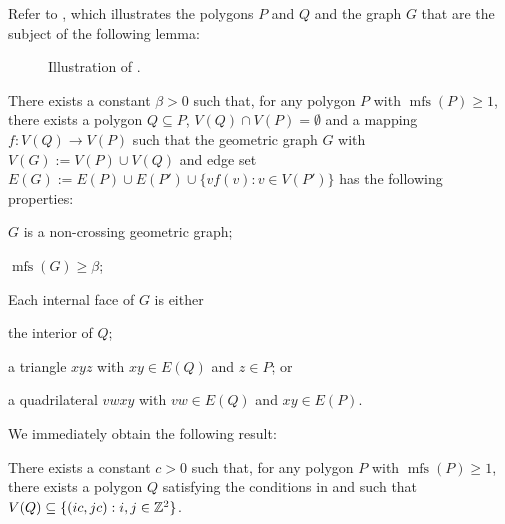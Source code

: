 \documentclass{article}
\DeclareMathOperator{\mfs}{mfs}
\begin{document}
Refer to , which illustrates the polygons $P$ and $Q$ and the graph $G$ that are the subject of the following lemma:

\begin{figure}
    \centering{\texttt{[image: pq]}}
    \caption{Illustration of .}
\end{figure}

\begin{lem}
    There exists a constant $\beta >0$ such that, for any polygon $P$ with $\mfs(P)\ge 1$, there exists a polygon $Q\subseteq P$, $V(Q)\cap V(P)=\emptyset$ and a mapping $f:V(Q)\to V(P)$ such that the geometric graph $G$ with $V(G):=V(P)\cup V(Q)$ and edge set $E(G):=E(P)\cup E(P')\cup\{vf(v):v\in V(P')\}$ has the following properties:
    \begin{compactenum}[(P1)]
        \item $G$ is a non-crossing geometric graph;
        \item $\mfs(G)\ge \beta$;
        \item Each internal face of $G$ is either
        \begin{compactenum}[(i)]
            \item the interior of $Q$;
            \item a triangle $xyz$ with $xy\in E(Q)$ and $z\in P$; or
            \item a quadrilateral $vwxy$ with $vw\in E(Q)$ and $xy\in E(P)$.
        \end{compactenum}
    \end{compactenum}
\end{lem}

We immediately obtain the following result:

\begin{lem}
    There exists a constant $c>0$ such that, for any polygon $P$ with $\mfs(P)\ge 1$, there exists a polygon $Q$ satisfying the conditions in  and such that $V(Q)\subseteq\{(ic,jc): i,j\in\mathbb{Z}^2\}$.
\end{lem}
\end{document}
